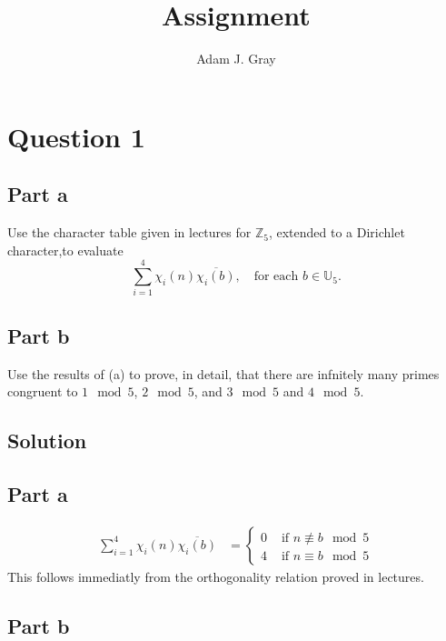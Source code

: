 \documentclass{unswmaths}
\begin{document}
\author{Adam J. Gray}
\subject{Number Theory}
\title{Assignment}

\unswtitle

\section*{Question 1}
\subsection*{Part a}
Use the character table given in lectures for $ \mathbb{Z}_5 $, extended to a Dirichlet character,to evaluate
$$
	\sum_{i=1}^4 \chi_i(n) \overline{ \chi_i(b)}, \ \ \ \text{ for each } b \in \mathbb{U}_5.
$$
\subsection*{Part b}
Use the results of (a) to prove, in detail, that there are infnitely many primes congruent to  $ 1 \mod 5 $,
$ 2 \mod 5 $, and $ 3 \mod 5 $ and $ 4 \mod 5 $.

\subsection*{Solution}
\subsection*{Part a}
\begin{align*}
	\sum_{i=1}^4 \chi_i(n) \overline{ \chi_i(b)} &=
	\begin{cases}
		0 & \text{ if } n \not\equiv b \mod 5 \\
		4 & \text{ if } n \equiv b \mod 5
	\end{cases}
\end{align*}
This follows immediatly from the orthogonality relation proved in lectures.
\subsection*{Part b}
\end{document}
